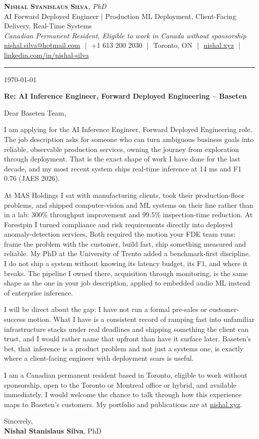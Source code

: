 \documentclass[11pt]{article}
\newcommand{\clName}{Nishal Stanislaus Silva}
\newcommand{\clStatus}{Canadian Permanent Resident, Eligible to work in Canada without sponsorship}
\newcommand{\clTagline}{AI Forward Deployed Engineer | Production ML Deployment, Client-Facing Delivery, Real-Time Systems}
\newcommand{\clRole}{AI Inference Engineer, Forward Deployed Engineering}
\newcommand{\clCompany}{Baseten}
\begin{document}
\pagestyle{empty}
\begin{center}
    {\LARGE \scshape \textbf{\clName}}{\large \textit{, PhD}}
    \\[1pt]
    {\small \clTagline}
    \\[1pt]
    {\footnotesize\textit{\clStatus}}
    \\[1pt]
    {\small
    \href{mailto:nishal.silva@hotmail.com}{nishal.silva@hotmail.com}
    \,\,|\,\, +1 613 200 2030
    \,\,|\,\, Toronto, ON
    \,\,|\,\, \href{https://nishal.xyz}{nishal.xyz}
    \,\,|\,\, \href{https://www.linkedin.com/in/nishal-silva}{linkedin.com/in/nishal-silva}}
\end{center}

\rule{\linewidth}{0.4pt}\vspace{0.6em}

\today

\textbf{Re: \clRole{} -- \clCompany{}}

Dear Baseten Team,

I am applying for the \clRole{} role. The job description asks for someone who can turn ambiguous business goals into reliable, observable production services, owning the journey from exploration through deployment. That is the exact shape of work I have done for the last decade, and my most recent system ships real-time inference at 14 ms and F1 0.76 (JAES 2026).

At MAS Holdings I sat with manufacturing clients, took their production-floor problems, and shipped computer-vision and ML systems on their line rather than in a lab: 300\% throughput improvement and 99.5\% inspection-time reduction. At Forestpin I turned compliance and risk requirements directly into deployed anomaly-detection services. Both required the motion your FDE team runs: frame the problem with the customer, build fast, ship something measured and reliable. My PhD at the University of Trento added a benchmark-first discipline. I do not ship a system without knowing its latency budget, its F1, and where it breaks. The pipeline I owned there, acquisition through monitoring, is the same shape as the one in your job description, applied to embedded audio ML instead of enterprise inference.

I will be direct about the gap: I have not run a formal pre-sales or customer-success motion. What I have is a consistent record of ramping fast into unfamiliar infrastructure stacks under real deadlines and shipping something the client can trust, and I would rather name that upfront than have it surface later. Baseten's bet, that inference is a product problem and not just a systems one, is exactly where a client-facing engineer with deployment scars is useful.

I am a Canadian permanent resident based in Toronto, eligible to work without sponsorship, open to the Toronto or Montreal office or hybrid, and available immediately. I would welcome the chance to talk through how this experience maps to Baseten's customers. My portfolio and publications are at \href{https://nishal.xyz}{nishal.xyz}.

\vspace{12pt}
Sincerely,\\[2pt]
\textbf{\clName}, PhD
\end{document}
